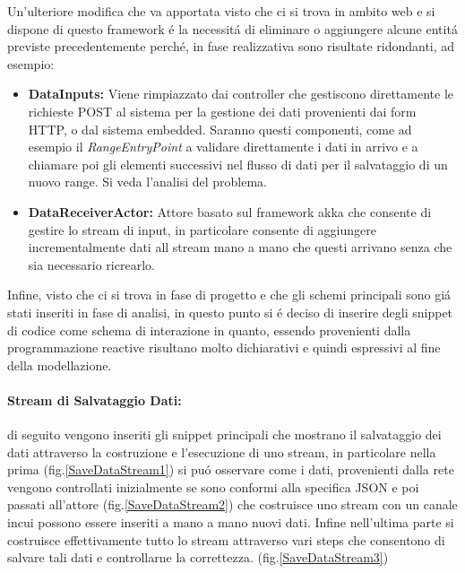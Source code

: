 Un'ulteriore modifica che va apportata visto che ci si trova in ambito web e si dispone di questo framework \'e la necessit\'a di eliminare o aggiungere alcune entit\'a previste precedentemente perch\'e, in fase realizzativa sono risultate ridondanti, ad esempio:
\begin{itemize}
\item \textbf{DataInputs:} Viene rimpiazzato dai controller che gestiscono direttamente le richieste POST al sistema per la gestione dei dati provenienti dai form HTTP, o dal sistema embedded. Saranno questi componenti, come ad esempio il \textit{RangeEntryPoint} a validare direttamente i dati in arrivo e a chiamare poi gli elementi successivi nel flusso di dati per il salvataggio di un nuovo range. Si veda l'analisi del problema.
  \item \textbf{DataReceiverActor: } Attore basato sul framework akka che consente di gestire lo stream di input, in particolare consente di aggiungere incrementalmente dati all stream mano a mano che questi arrivano senza che sia necessario ricrearlo.
\end{itemize}

Infine, visto che ci si trova in fase di progetto e che gli schemi principali sono gi\'a stati inseriti in fase di analisi, in questo punto si \'e deciso di inserire degli snippet di codice come schema di interazione in quanto, essendo provenienti dalla programmazione reactive risultano molto dichiarativi e quindi espressivi al fine della modellazione.

\paragraph{Stream di Salvataggio Dati:} di seguito vengono inseriti gli snippet principali che mostrano il salvataggio dei dati attraverso la costruzione e l'esecuzione di uno stream, in particolare nella prima (fig.\ref{SaveDataStream1}) si pu\'o osservare come i dati, provenienti dalla rete vengono controllati inizialmente se sono conformi alla specifica JSON e poi passati all'attore (fig.\ref{SaveDataStream2}) che costruisce uno stream con un canale incui possono essere inseriti a mano a mano nuovi dati. Infine nell'ultima parte si costruisce effettivamente tutto lo stream attraverso vari steps che consentono di salvare tali dati e controllarne la correttezza. (fig.\ref{SaveDataStream3})

